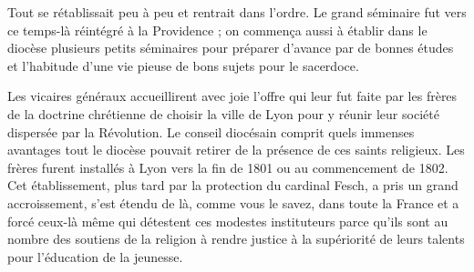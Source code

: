 Tout se rétablissait peu à peu et rentrait dans l'ordre. Le grand séminaire fut vers ce temps-là réintégré à la Providence ; on commença aussi à établir dans le diocèse plusieurs petits séminaires pour préparer d'avance par de bonnes études et l'habitude d'une vie pieuse de bons sujets pour le sacerdoce.

Les vicaires généraux accueillirent avec joie l'offre qui leur fut faite par les frères de la doctrine chrétienne de choisir la ville de Lyon pour y réunir leur société dispersée par la Révolution. Le conseil diocésain comprit quels immenses avantages tout le diocèse pouvait retirer de la présence de ces saints religieux. Les frères furent installés à Lyon
vers la fin de 1801 ou au commencement de 1802. Cet établissement, plus tard par la protection du cardinal Fesch, a pris un grand accroissement, s'est étendu de là, comme vous le savez, dans toute la France et a forcé ceux-là même qui détestent ces modestes instituteurs parce qu'ils sont au nombre des soutiens de la religion à rendre justice à la supériorité de leurs talents pour l'éducation de la jeunesse.

